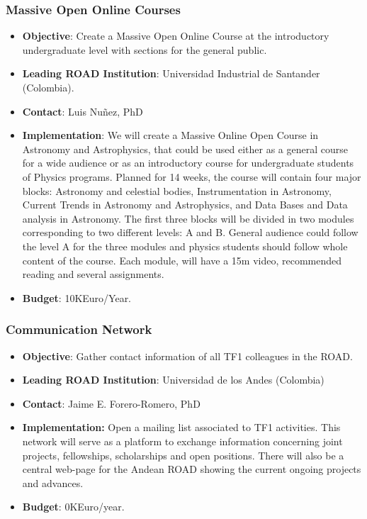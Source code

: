 \documentclass[12pt]{article}
\begin{document}
\subsubsection{Massive Open Online Courses}
\begin{itemize}
\item{\bf Objective}: Create a Massive Open
Online Course at the introductory undergraduate level with sections for
the general public. 
\item{\bf Leading ROAD Institution}: Universidad Industrial de
  Santander (Colombia).  
\item{\bf Contact}: Luis Nu\~nez, PhD
\item{\bf Implementation}: 
We will create a Massive Online Open
Course in Astronomy and Astrophysics, that could be used either as a
general course for a wide audience or as an introductory course for
undergraduate students of  Physics programs. Planned for 14 weeks,
the course will contain four major blocks: Astronomy and celestial
bodies, Instrumentation in Astronomy, Current Trends in Astronomy and
Astrophysics, and  Data Bases and Data analysis in Astronomy. The
first three blocks will be divided in two modules corresponding to two
different levels: A and B. General audience could follow the level A
for the three modules and physics students should follow whole content
of the course. Each module, will have a 15m video, recommended reading
and several assignments.  
\item{\bf Budget}: 10KEuro/Year.
\end{itemize}


\subsubsection{Communication Network}
\begin{itemize}
  \item{\bf Objective}: Gather contact information of all TF1 colleagues in
    the ROAD.
  \item{\bf Leading ROAD Institution}: Universidad de los Andes (Colombia)
  \item{\bf Contact}: Jaime E. Forero-Romero, PhD
  \item{\bf Implementation:} Open a mailing list associated to TF1
    activities. This network will serve as a platform to exchange
    information concerning joint projects, fellowships, scholarships
    and open positions. There will also be a central web-page for the
    Andean ROAD showing the current ongoing projects and advances.
  \item{\bf Budget}: 0KEuro/year.
\end{itemize}
\end{document}
